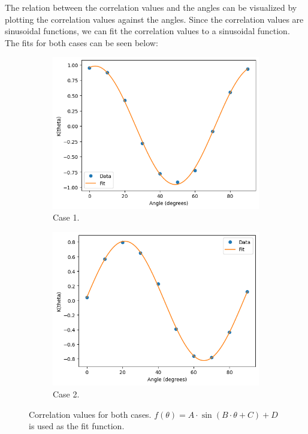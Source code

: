 The relation between the correlation values and the angles can be visualized by plotting the correlation values against the angles. Since the correlation values are sinusoidal functions, we can fit the correlation values to a sinusoidal function. The fits for both cases can be seen below:
\begin{figure}[h!]
    \centering
    \begin{subfigure}[t]{0.45\textwidth}
        \centering
        \includegraphics[width=\textwidth]{figures/fit_1.png}
        \caption{Case 1.}
        \label{fig:fit_1}
    \end{subfigure}
    \hfill
    \begin{subfigure}[t]{0.45\textwidth}
        \centering
        \includegraphics[width=\textwidth]{figures/fit_2.png}
        \caption{Case 2.}
        \label{fig:fit_2}
    \end{subfigure}
    \caption{Correlation values for both cases. 
        $f(\theta) = A \cdot \sin(B \cdot \theta + C) + D$ is used as the fit function.
    }
    \label{fig:fit_comparison}
\end{figure}

